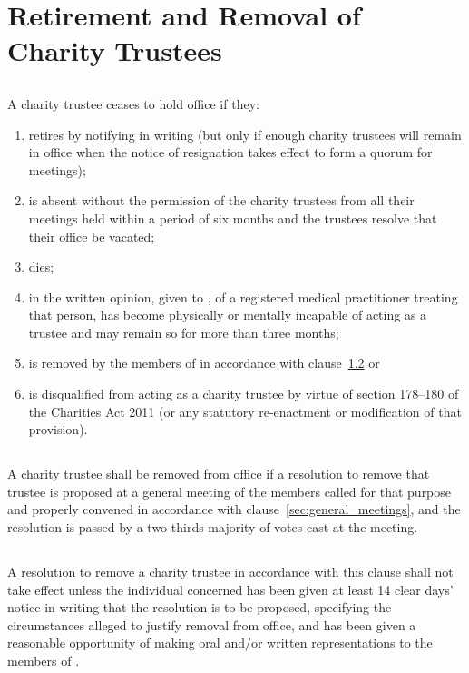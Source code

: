 \section{Retirement and Removal of Charity Trustees}\label{sec:retirement_removal}

    \subsection{}\label{sec:retirement}
    A charity trustee ceases to hold office if they:
    \begin{enumerate}
        \item retires by notifying \shortname{} in writing (but only if enough charity trustees will remain in office when the notice of resignation takes effect to form a quorum for meetings);
        \item is absent without the permission of the charity trustees from all their meetings held within a period of six months and the trustees resolve that their office be vacated;
        \item dies;
        \item in the written opinion, given to \shortname{}, of a registered medical practitioner treating that person, has become physically or mentally incapable of acting as a trustee and may remain so for more than three months;
        \item is removed by the members of \shortname{} in accordance with clause~\ref{sec:removal} or
        \item\label{item:trustee_disqualification} is disqualified from acting as a charity trustee by virtue of section 178--180 of the Charities Act 2011 (or any statutory re-enactment or modification of that provision).
    \end{enumerate}

    \subsection{}\label{sec:removal}
    A charity trustee shall be removed from office if a resolution to remove that trustee is proposed at a general meeting of the members called for that purpose and properly convened in accordance with clause~\ref{sec:general_meetings}, and the resolution is passed by a two-thirds majority of votes cast at the meeting.

    \subsection{}
    A resolution to remove a charity trustee in accordance with this clause shall not take effect unless the individual concerned has been given at least 14 clear days' notice in writing that the resolution is to be proposed, specifying the circumstances alleged to justify removal from office, and has been given a reasonable opportunity of making oral and/or written representations to the members of \shortname{}.
